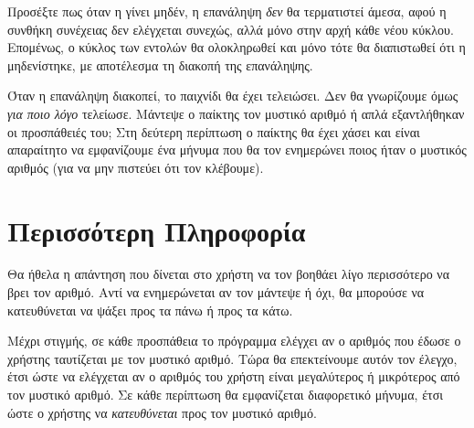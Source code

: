 \documentclass[a4paper,11pt,oneside]{book}
\begin{document}
Προσέξτε πως όταν η  γίνει μηδέν, η επανάληψη \emph{δεν} θα τερματιστεί άμεσα, αφού η συνθήκη συνέχειας δεν ελέγχεται συνεχώς, αλλά μόνο στην αρχή κάθε νέου κύκλου. Επομένως, ο κύκλος των εντολών θα ολοκληρωθεί και μόνο τότε θα διαπιστωθεί ότι η  μηδενίστηκε, με αποτέλεσμα τη διακοπή της επανάληψης.

Όταν η επανάληψη διακοπεί, το παιχνίδι θα έχει τελειώσει. Δεν θα γνωρίζουμε όμως \emph{για ποιο λόγο} τελείωσε. Μάντεψε ο παίκτης τον μυστικό αριθμό ή απλά εξαντλήθηκαν οι προσπάθειές του; Στη δεύτερη περίπτωση ο παίκτης θα έχει χάσει και είναι απαραίτητο να εμφανίζουμε ένα μήνυμα που θα τον ενημερώνει ποιος ήταν ο μυστικός αριθμός (για να μην πιστεύει ότι τον κλέβουμε).



\section{Περισσότερη Πληροφορία}

\begin{question}
Θα ήθελα η απάντηση που δίνεται στο χρήστη να τον βοηθάει λίγο περισσότερο να βρει τον αριθμό.
Αντί να ενημερώνεται αν τον μάντεψε ή όχι, θα μπορούσε να κατευθύνεται να ψάξει προς τα πάνω 
ή προς τα κάτω.
\end{question}

Μέχρι στιγμής, σε κάθε προσπάθεια το πρόγραμμα ελέγχει αν ο αριθμός που έδωσε ο χρήστης ταυτίζεται με τον μυστικό αριθμό. Τώρα θα επεκτείνουμε αυτόν τον έλεγχο, έτσι ώστε να ελέγχεται αν ο αριθμός του χρήστη είναι μεγαλύτερος ή μικρότερος από τον μυστικό αριθμό. Σε κάθε περίπτωση θα εμφανίζεται διαφορετικό μήνυμα, έτσι ώστε ο χρήστης να \emph{κατευθύνεται} προς τον μυστικό αριθμό.

\end{document}
